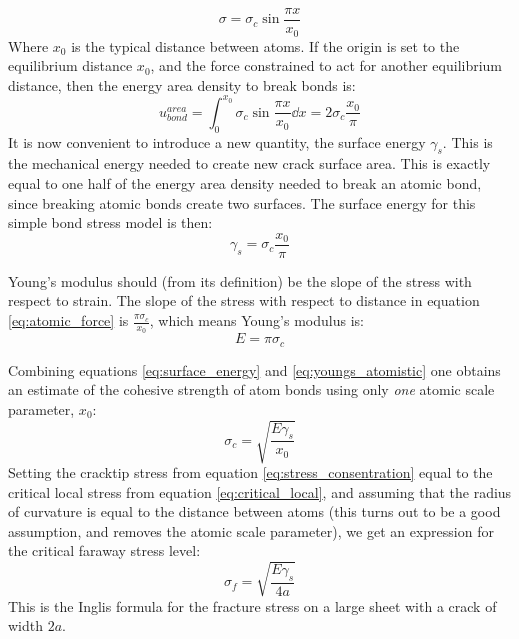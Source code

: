 \begin{equation}
	\sigma = \sigma_c \sin{\frac{\pi x}{x_0}}
	\label{eq:atomic_force}
\end{equation}
Where $x_0$ is the typical distance between atoms. If the origin is set to the equilibrium distance $x_0$, and the force constrained to act for another equilibrium distance, then the energy area density to break bonds is:
\begin{equation}
u_{bond}^{area} = \int_0^{x_0} \sigma_c \sin{\frac{\pi x}{x_0}} \dd x = 2\sigma_c \frac{x_0}{\pi}
\end{equation}
It is now convenient to introduce a new quantity, the surface energy $\gamma_s$. This is the mechanical energy needed to create new crack surface area. This is exactly equal to one half of the energy area density needed to break an atomic bond, since breaking atomic bonds create two surfaces. The surface energy for this simple bond stress model is then:
\begin{equation}
	\gamma_s = \sigma_c \frac{x_0}{\pi}
	\label{eq:surface_energy}
\end{equation}

Young's modulus should (from its definition) be the slope of the stress with respect to strain. The slope of the stress with respect to distance in equation \ref{eq:atomic_force} is $\frac{\pi\sigma_c}{x_0}$, which means Young's modulus is:
\begin{equation}
E = \pi\sigma_c
\label{eq:youngs_atomistic}
\end{equation}

Combining equations \ref{eq:surface_energy} and \ref{eq:youngs_atomistic} one obtains an estimate of the cohesive strength of atom bonds using only \emph{one} atomic scale parameter, $x_0$:
\begin{equation}
	\sigma_c = \sqrt{\frac{E\gamma_s}{x_0}}
	\label{eq:critical_local}
\end{equation}
Setting the cracktip stress from equation \ref{eq:stress_consentration} equal to the critical local stress from equation \ref{eq:critical_local}, and assuming that the radius of curvature is equal to the distance between atoms (this turns out to be a good assumption, and removes the atomic scale parameter), we get an expression for the critical faraway stress level:
\begin{equation}
	\sigma_f = \sqrt{\frac{E\gamma_s}{4a}}
	\label{eq:inglis_formula}
\end{equation}
This is the Inglis formula for the fracture stress on a large sheet with a crack of width $2a$.

